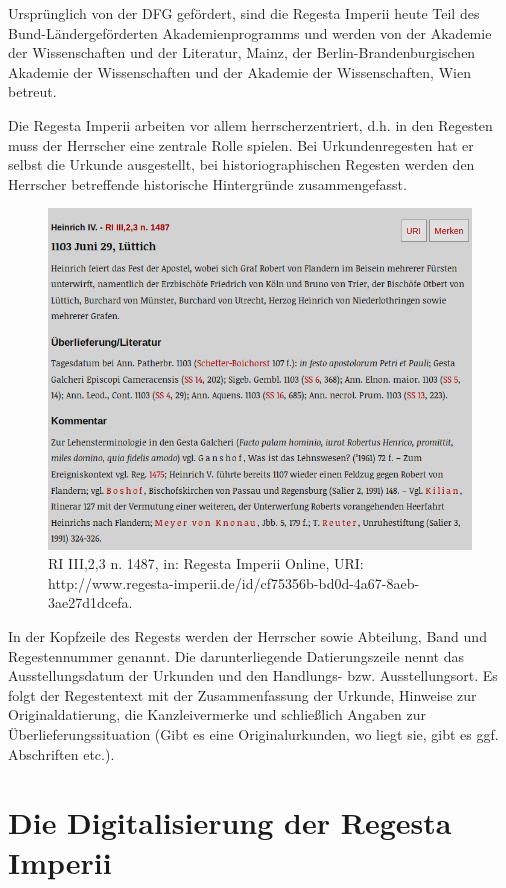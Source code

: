 \documentclass[ngerman,]{scrreprt}
\begin{document}
Ursprünglich von der DFG gefördert, sind die Regesta Imperii heute Teil des Bund-Ländergeförderten Akademienprogramms und werden von der Akademie der Wissenschaften und der Literatur, Mainz, der Berlin-Brandenburgischen Akademie der Wissenschaften und der Akademie der Wissenschaften, Wien betreut.

Die Regesta Imperii arbeiten vor allem herrscherzentriert, d.h. in den Regesten muss der Herrscher eine zentrale Rolle spielen. Bei Urkundenregesten hat er selbst die Urkunde ausgestellt, bei historiographischen Regesten werden den Herrscher betreffende historische Hintergründe zusammengefasst.

\begin{figure}
\centering
\includegraphics{Bilder/RI2Graph/ReggH4-Nr-1487.png}
\caption{RI III,2,3 n. 1487, in: Regesta Imperii Online, URI: http://www.regesta-imperii.de/id/cf75356b-bd0d-4a67-8aeb-3ae27d1dcefa.}
\end{figure}

In der Kopfzeile des Regests werden der Herrscher sowie Abteilung, Band und Regestennummer genannt. Die darunterliegende Datierungszeile nennt das Ausstellungsdatum der Urkunden und den Handlungs- bzw. Ausstellungsort. Es folgt der Regestentext mit der Zusammenfassung der Urkunde, Hinweise zur Originaldatierung, die Kanzleivermerke und schließlich Angaben zur Überlieferungssituation (Gibt es eine Originalurkunden, wo liegt sie, gibt es ggf. Abschriften etc.).

\hypertarget{die-digitalisierung-der-regesta-imperii}{%
\section{Die Digitalisierung der Regesta Imperii}\label{die-digitalisierung-der-regesta-imperii}}
\end{document}
